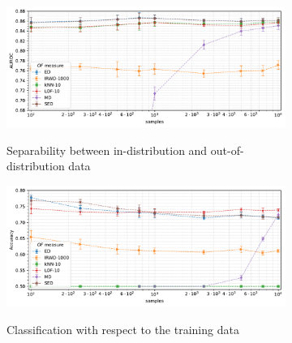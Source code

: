 \begin{figure}[t]
    \centering
    \begin{subfigure}[b]{0.9\textwidth}
        \centering
        \caption{\small Separability between in-distribution and out-of-distribution data}
        \includegraphics[width=\textwidth]{images/distributions/trends-n/trend-distributions-auroc(samples)-dimension_750-distance_8-distribution_gaussian-model_ED,IRWD-1000,kNN-10,LOF-10,MD,SED-aggregated.pdf}
        \label{fig:samples-auroc}
    \end{subfigure}
    \begin{subfigure}[b]{0.9\textwidth}
        \centering
        \caption{\small Classification with respect to the training data}
        \includegraphics[width=\textwidth]{images/distributions/trends-n/trend-distributions-accuracy_95(samples)-dimension_750-distance_8-distribution_gaussian-model_ED,IRWD-1000,kNN-10,LOF-10,MD,SED-aggregated.pdf}
        \label{fig:samples-accuracy}
    \end{subfigure}
    \begin{subfigure}[b]{0.495\textwidth}

\end{subfigure}
\end{figure}
